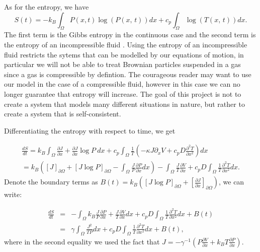 As for the entropy, we have \cite{Streater1997a}
\begin{equation}
S(t) = -k_B \int_{\Omega} P(x, t) \log(P(x, \, t)) dx + c_p \int_{\Omega} \log(T(x, \, t)) dx.
\end{equation}
The first term is the Gibbs entropy in the continuous case \cite{Jaynes1965} and the second term is the entropy of an incompressible fluid \cite{CengelBoles1994}. Using the entropy of an incompressible fluid restricts the sytems that can be modelled by our equations of motion, in particular we will not be able to treat Brownian particles suspended in a gas since a gas is compressible by defintion. The courageous reader may want to use our model in the case of a compressible fluid, however in this case we can no longer guarantee that entropy will increase. The goal of this project is not to create a system that models many different situations in nature, but rather to create a system that is self-consistent.

Differentiating the entropy with respect to time, we get

\begin{align}
\frac{d S}{d t} =  k_B \int_{\Omega} \frac{\partial J}{\partial x} + \frac{\partial J}{\partial x} \log P \ dx + c_p \int_{\Omega} \frac{1}{T} \left(-\kappa J \partial_x V + c_p D \frac{\partial^2 T}{\partial x^2} \right) dx \\
                     = k_B \left ( [J]_{\partial \Omega} + [J \log P]_{\partial \Omega} - \int_{\Omega} \frac{J}{P} \frac{\partial P}{\partial x} dx \right) - \int_{\Omega} \frac{J}{T} \frac{\partial V}{\partial x} + c_p D \int_{\Omega} \frac{1}{T} \frac{\partial^2 T}{\partial x^2} dx.
\end{align}
Denote the boundary terms as $B(t) = k_B( [J \log P]_{\partial \Omega} + \left[\frac{\partial J}{\partial x} \right]_{\partial \Omega} ) $, we can write:

\begin{eqnarray}
\frac{d S}{d t} & = & - \int_{\Omega} k_B \frac{J}{P} \frac{\partial P}{\partial x} + \frac{J}{T} \frac{\partial V}{\partial x} dx +  c_p D \int_{\Omega} \frac{1}{T} \frac{\partial^2 T}{\partial x^2} dx + B(t) \\
                    & = & \gamma \int_{\Omega} \frac{J^2}{T P} dx + c_p D \int_{\Omega} \frac{1}{T} \frac{\partial^2 T}{\partial x^2} dx + B(t), \label{eqn:entropyGen}
\end{eqnarray}
where in the second equality we used the fact that $J = -\gamma^{-1} ( P \frac{\partial V}{\partial x} + k_B T \frac{\partial P}{\partial x})$.

